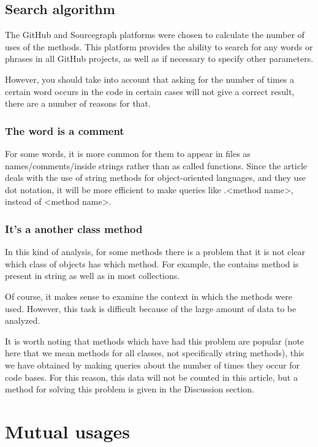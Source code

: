\documentclass[anonymous,sigplan,review,11pt,nonacm,natbib=false]{acmart}
\begin{document}
\subsection{Search algorithm}

The GitHub and Sourcegraph platforms were chosen to calculate the number of uses of the methods. This platform provides the ability to search for any words or phrases in all GitHub projects, as well as if necessary to specify other parameters.

However, you should take into account that asking for the number of times a certain word occurs in the code in certain cases will not give a correct result, there are a number of reasons for that.

\subsubsection{The word is a comment} \hl{}

For some words, it is more common for them to appear in files as names/comments/inside strings rather than as called functions. Since the article deals with the use of string methods for object-oriented languages, and they use dot notation, it will be more efficient to make queries like .<method name>, instead of <method name>.

\subsubsection{It's a another class method} \hl{}

In this kind of analysis, for some methods there is a problem that it is not clear which class of objects has which method. For example, the contains method is present in string as well as in most collections. 

Of course, it makes sense to examine the context in which the methods were used. However, this task is difficult because of the large amount of data to be analyzed.

It is worth noting that methods which have had this problem are popular (note here that we mean methods for all classes, not specifically string methods), this we have obtained by making queries about the number of times they occur for code bases. For this reason, this data will not be counted in this article, but a method for solving this problem is given in the Discussion section.

\section{Mutual usages}
\end{document}
